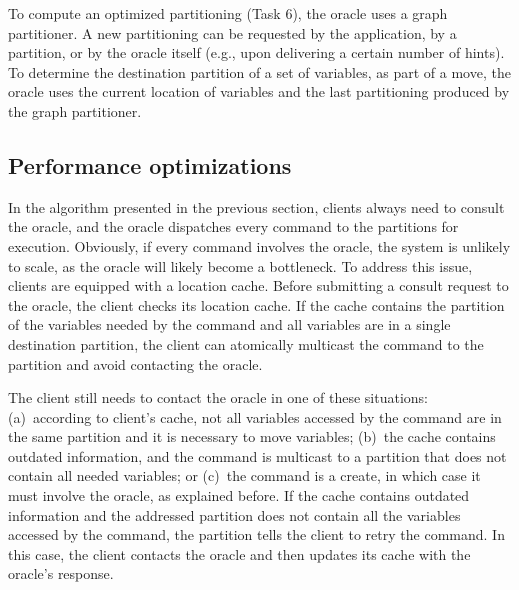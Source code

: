 To compute an optimized partitioning (Task 6), the oracle uses a graph partitioner.
A new partitioning can be requested by the application, by a partition, or by the oracle itself (e.g., upon delivering a certain number of hints).
To determine the destination partition of a set of variables, as part of a move, the oracle uses the current location of variables and the last partitioning produced by the graph partitioner.


\subsection{Performance optimizations}
\label{sec:optm}

In the algorithm presented in the previous section, clients always need to consult the oracle, and the oracle dispatches every command to the partitions for execution.
Obviously, if every command involves the oracle, the system is unlikely to scale, as the oracle will likely become a bottleneck.
To address this issue, clients are equipped with a location cache.
Before submitting a consult request to the oracle, the client checks its location cache.
If the cache contains the partition of the variables needed by the command and all variables are in a single destination partition, the client can atomically multicast the command to the partition and avoid contacting the oracle. 

The client still needs to contact the oracle in one of these situations:
(a)~according to client's cache, not all variables accessed by the command are in the same partition and it is necessary to move variables;
(b)~the cache contains outdated information, and the command is multicast to a partition that does not contain all needed variables; or
(c)~the command is a create, in which case it must involve the oracle, as explained before.
If the cache contains outdated information and the addressed partition does not contain all the variables accessed by the command, the partition tells the client to retry the command.
In this case, the client contacts the oracle and then updates its cache with the oracle's response.






